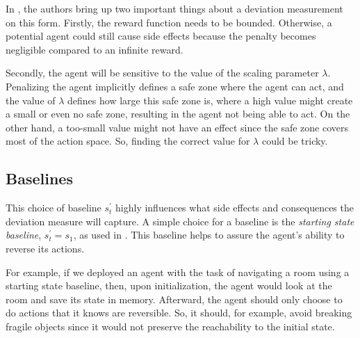 \documentclass[12pt,A4]{report}
\newcommand{\autobaj}{}
\theoremstyle{definition}
\begin{document}
In \citet{ArmstrongLevinstein}, the authors bring up two important things about a deviation measurement on this form. Firstly, the reward function needs to be bounded. Otherwise, a potential agent could still cause side effects because the penalty becomes negligible compared to an infinite reward. 

Secondly, the agent will be sensitive to the value of the scaling parameter $\lambda$. Penalizing the agent implicitly defines a safe zone where the agent can act, and the value of $\lambda$ defines how large this safe zone is, where a high value might create a small or even no safe zone, resulting in the agent not being able to act. On the other hand, a too-small value might not have an effect since the safe zone covers most of the action space. So, finding the correct value for $\lambda$ could be tricky. 





\subsection{Baselines}
This choice of baseline $s^\prime_t$ highly influences what side effects and consequences the deviation measure will capture. A simple choice for a baseline is the \textit{starting state baseline}, $s^{\prime}_t = s_1$, as used in \citet{Eysenbach}. This baseline helps to assure the agent's ability to reverse its actions. 

For example, if we deployed an agent with the task of navigating a room using a starting state baseline, then, upon initialization, the agent would look at the room and save its state in memory. Afterward, the agent should only choose to do actions that it knows are reversible. So, it should, for example, avoid breaking fragile objects since it would not preserve the reachability to the initial state. 
\end{document}

